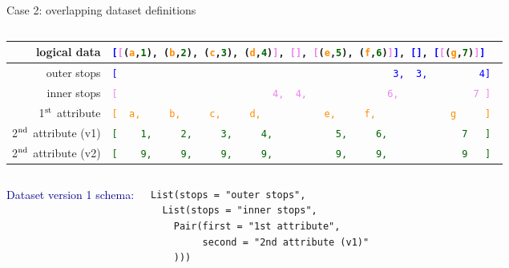 \documentclass[aspectratio=169]{beamer}
\begin{document}
\begin{frame}[fragile]{Case 2: overlapping dataset definitions}
\vspace{0.5 cm}

\begin{columns}
\begin{tabular}{r l}
\small logical data & {\tt\scriptsize \textcolor{blue}{[}\textcolor{violet}{[}(\textcolor{darkorange}{a},\textcolor{darkgreen}{1}), (\textcolor{darkorange}{b},\textcolor{darkgreen}{2}), (\textcolor{darkorange}{c},\textcolor{darkgreen}{3}), (\textcolor{darkorange}{d},\textcolor{darkgreen}{4})\textcolor{violet}{]}, \textcolor{violet}{[]}, \textcolor{violet}{[}(\textcolor{darkorange}{e},\textcolor{darkgreen}{5}), (\textcolor{darkorange}{f},\textcolor{darkgreen}{6})\textcolor{violet}{]}\textcolor{blue}{]}, \textcolor{blue}{[]}, \textcolor{blue}{[}\textcolor{violet}{[}(\textcolor{darkorange}{g},\textcolor{darkgreen}{7})\textcolor{violet}{]}\textcolor{blue}{]}\ \textcolor{white}{]}} \\\hline
\small outer stops & {\tt\scriptsize \textcolor{blue}{[\ \ \ \ \ \ \ \ \ \ \ \ \ \ \ \ \ \ \ \ \ \ \ \ \ \ \ \ \ \ \ \ \ \ \ \ \ \ \ \ \ \ \ \ \ \ \ \ 3,\ \ 3,\ \ \ \ \ \ \ \ \ 4]}} \\
\small inner stops & {\tt\scriptsize \textcolor{violet}{[\ \ \ \ \ \ \ \ \ \ \ \ \ \ \ \ \ \ \ \ \ \ \ \ \ \ \ 4,\ \ 4,\ \ \ \ \ \ \ \ \ \ \ \ \ \ 6,\ \ \ \ \ \ \ \ \ \ \ \ \ 7\ ]}} \\
\small 1$^{\mbox{\scriptsize st}}$ attribute & {\tt\scriptsize \textcolor{darkorange}{[\ \ a,\ \ \ \ \ b,\ \ \ \ \ c,\ \ \ \ \ d,\ \ \ \ \ \ \ \ \ \ \ e,\ \ \ \ \ f,\ \ \ \ \ \ \ \ \ \ \ \ \ g\ \ \ \ \ ]}} \\
\small 2$^{\mbox{\scriptsize nd}}$ attribute (v1) & {\tt\scriptsize \textcolor{darkgreen}{[\ \ \ \ 1,\ \ \ \ \ 2,\ \ \ \ \ 3,\ \ \ \ \ 4,\ \ \ \ \ \ \ \ \ \ \ 5,\ \ \ \ \ 6,\ \ \ \ \ \ \ \ \ \ \ \ \ 7\ \ \ ]}} \\
\small 2$^{\mbox{\scriptsize nd}}$ attribute (v2) & {\tt\scriptsize \textcolor{darkgreen}{[\ \ \ \ 9,\ \ \ \ \ 9,\ \ \ \ \ 9,\ \ \ \ \ 9,\ \ \ \ \ \ \ \ \ \ \ 9,\ \ \ \ \ 9,\ \ \ \ \ \ \ \ \ \ \ \ \ 9\ \ \ ]}}
\end{tabular}
\end{columns}

\vspace{0.5 cm}
\begin{columns}[t]
\textcolor{darkblue}{Dataset version 1 schema:}
{\scriptsize
\begin{verbatim}
List(stops = "outer stops",
  List(stops = "inner stops",
    Pair(first = "1st attribute",
         second = "2nd attribute (v1)"
    )))
\end{verbatim}}


\end{columns}
\end{frame}
\end{document}
